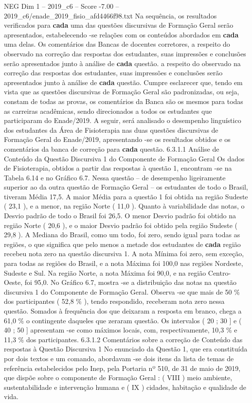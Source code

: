 \begin{textsample}{NEG Dim 1 – 2019\_c6 – Score -7.00 – 2019\_c6/enade\_2019\_fisio\_afd4466f98.txt}
Na sequência, os resultados verificados para \textbf{cada} uma das questões discursivas de Formação Geral serão apresentados, estabelecendo -se relações com os conteúdos abordados em \textbf{cada} uma delas.
Os comentários das Bancas de docentes corretores, a respeito do observado na correção das respostas dos estudantes, suas impressões e conclusões serão apresentados junto à análise de \textbf{cada} questão. a respeito do observado na correção das respostas dos estudantes, suas impressões e conclusões serão apresentados junto à análise de \textbf{cada} questão.
Cumpre esclarecer que, tendo em vista que as questões discursivas de Formação Geral são padronizadas, ou seja, constam de todas as provas, os comentários da Banca são os mesmos para todas as carreiras acadêmicas, sendo direcionados a todos os estudantes que participaram do Enade/2019.
A seguir, será analisado o desempenho linguístico dos estudantes da Área de Fisioterapia nas duas questões discursivas de Formação Geral do Enade/2019, apresentando -se os resultados obtidos e os comentários da banca de correção para \textbf{cada} questão. 6.3.1.1 Análise de Conteúdo da Questão Discursiva 1 do Componente de Formação Geral Os dados de Fisioterapia, obtidos a partir das respostas à questão 1, encontram -se na Tabela 6.14 e no Gráfico 6.7.
Nessa questão – de desempenho ligeiramente superior ao da outra questão de Formação Geral – os estudantes de todo o Brasil, tiveram Média 17,5.
A maior Média para a questão 1 foi obtida na região Sudeste ( 23,1 ), e a menor, na região Norte ( 11,0 ).
Quanto à variabilidade das notas, o Desvio padrão de todo o Brasil foi 26,5.
O menor Desvio padrão foi obtido na região Norte ( 20,6 ), e o maior Desvio padrão foi obtido pela região Sudeste ( 29,8 ).
A Mediana do Brasil, como um todo, foi zero, sendo igual para todas as regiões, o que significa que pelo menos a metade dos estudantes de \textbf{cada} região recebeu nota zero na questão discursiva 1.
A nota Mínima foi zero, sem exceção, para todas as regiões do Brasil, e a nota Máxima foi 100,0 nas regiões Nordeste, Sudeste e Sul.
Na região Norte, a nota Máxima foi 90,0, e na região Centro-Oeste, foi 95,0.
No Gráfico 6.7, mostra -se a distribuição das notas na questão discursiva 1 do Componente de Formação Geral.
Observa -se que mais de 50 \% dos participantes ( 52,8 \% ), tendo respondido, receberam nota zero nessa questão.
Somados à frequência dos que deixaram a resposta em branco, chega a 61,0 \% o contingente daqueles que zeraram questão.
Os intervalos ( 20 ; 30 ] e ( 40 ; 50 ] apresentam -se como máximos locais, com, respectivamente, 10,3 \% e 11,3 \% dos participantes. 6.3.1.2 Comentários sobre a correção de Conteúdo das respostas à Questão Discursiva 1 No enunciado da Questão 1, que era constituída por dois textos e um comando, abordavam -se dois itens da lista de temas de referência estabelecidos pelo Inep, pela Portaria nº 510, de 31 de maio de 2019, que dispõe sobre o componente de Formação Geral : ( VIII ) meio ambiente, sustentabilidade e intervenção humana e ( IX ) cidades, habitação e qualidade de vida.

\end{textsample}
